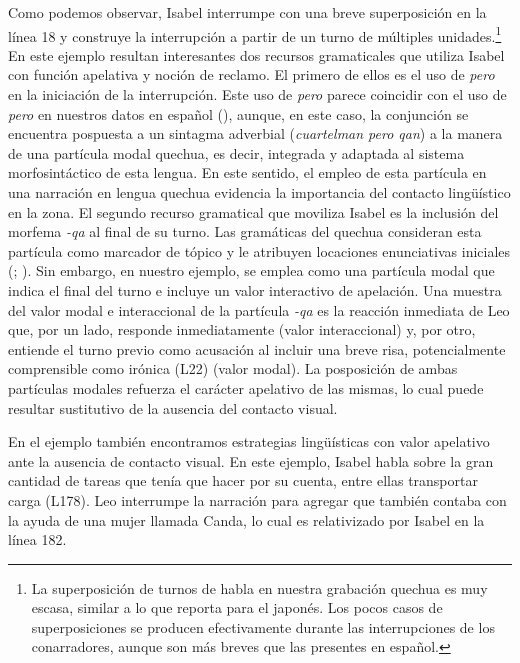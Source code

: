 \documentclass[output=paper]{../langscibook}
\begin{document}
Como podemos observar, Isabel interrumpe con una breve superposición en la línea 18 y construye la interrupción a partir de un turno de múltiples unidades.\footnote{La superposición de turnos de habla en nuestra grabación quechua es muy escasa, similar a lo que reporta \citet{Yamada1997} para el japonés. Los pocos casos de superposiciones se producen efectivamente durante las interrupciones de los conarradores, aunque son más breves que las presentes en español.}  En este ejemplo resultan interesantes dos recursos gramaticales que utiliza Isabel con función apelativa y noción de reclamo. El primero de ellos es el uso de \textit{pero} en la iniciación de la interrupción. Este uso de \textit{pero} parece coincidir con el uso de \textit{pero} en nuestros datos en español (), aunque, en este caso, la conjunción se encuentra pospuesta a un sintagma adverbial (\textit{cuartelman pero qan}) a la manera de una partícula modal quechua, es decir, integrada y adaptada al sistema morfosintáctico de esta lengua. En este sentido, el empleo de esta partícula en una narración en lengua quechua evidencia la importancia del contacto lingüístico en la zona. El segundo recurso gramatical que moviliza Isabel es la inclusión del morfema \textit{{}-qa} al final de su turno. Las gramáticas del quechua consideran esta partícula como marcador de tópico y le atribuyen locaciones enunciativas iniciales (\citealt{Cerrón-Palomino2008};  \citealt{PlazaMartínez2009}). Sin embargo, en nuestro ejemplo, se emplea como una partícula modal que indica el final del turno e incluye un valor interactivo de apelación. Una muestra del valor modal e interaccional de la partícula \textit{{}-qa} es la reacción inmediata de Leo que, por un lado, responde inmediatamente (valor interaccional) y, por otro, entiende el turno previo como acusación al incluir una breve risa, potencialmente comprensible como irónica (L22) (valor modal). La posposición de ambas partículas modales refuerza el carácter apelativo de las mismas, lo cual puede resultar sustitutivo de la ausencia del contacto visual.

En el ejemplo  también encontramos estrategias lingüísticas con valor apelativo ante la ausencia de contacto visual. En este ejemplo, Isabel habla sobre la gran cantidad de tareas que tenía que hacer por su cuenta, entre ellas transportar carga (L178). Leo interrumpe la narración para agregar que también contaba con la ayuda de una mujer llamada Canda, lo cual es relativizado por Isabel en la línea 182.
\end{document}
